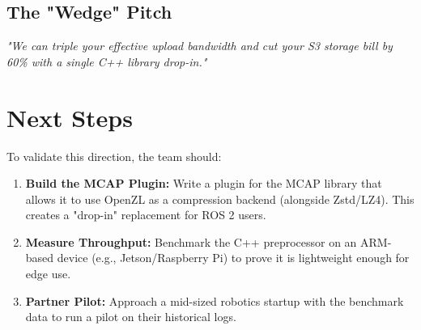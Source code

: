 \documentclass[11pt, letterpaper]{article}
\begin{document}
\subsection{The "Wedge" Pitch}
\textit{"We can triple your effective upload bandwidth and cut your S3 storage bill by 60\% with a single C++ library drop-in."}

\section{Next Steps}
To validate this direction, the team should:
\begin{enumerate}
    \item \textbf{Build the MCAP Plugin:} Write a plugin for the MCAP library that allows it to use OpenZL as a compression backend (alongside Zstd/LZ4). This creates a "drop-in" replacement for ROS 2 users.
    \item \textbf{Measure Throughput:} Benchmark the C++ preprocessor on an ARM-based device (e.g., Jetson/Raspberry Pi) to prove it is lightweight enough for edge use.
    \item \textbf{Partner Pilot:} Approach a mid-sized robotics startup with the benchmark data to run a pilot on their historical logs.
\end{enumerate}
\end{document}
